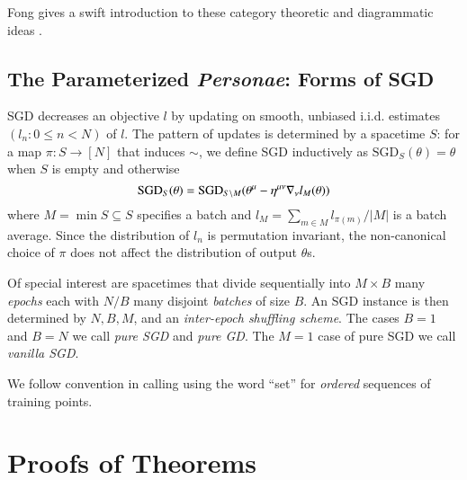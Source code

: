 \documentclass{article}
\newcommand{\SGD}{\text{\textnormal{SGD}}}
\newcommand{\wabs}[1]{\left|#1\right|}
\begin{document}
        Fong gives a swift introduction to these category theoretic and
        diagrammatic ideas .

    \subsection{The Parameterized \emph{Personae}: Forms of SGD}
        SGD decreases an objective $l$ by updating on smooth, unbiased i.i.d.
        estimates $(l_n: 0\leq n<N)$ of $l$.  The pattern of updates is
        determined by a spacetime $S$: for a map
        $\pi:S\to [N]$ that induces $\sim$, we define SGD inductively as
        $\text{SGD}_{S}(\theta) = \theta$ when $S$ is empty and otherwise
        $$
            \SGD_S(\theta)
            =
            \SGD_{S\setminus M}(
                \theta^\mu - \eta^{\mu\nu} \nabla_\nu l_{M}(\theta)
            )
        $$
        where $M = \min S \subseteq S$ specifies a batch and $l_M = \sum_{m\in
        M} l_{\pi(m)} / \wabs{M}$ is a batch average.  Since the distribution
        of $l_n$ is permutation invariant, the non-canonical choice of $\pi$
        does not affect the distribution of output $\theta$s.
    
        Of special interest are spacetimes that divide sequentially into
        $M\times B$ many \emph{epochs} each with $N/B$ many disjoint
        \emph{batches} of size $B$.  An SGD instance is then determined by $N,
        B, M$, and an \emph{inter-epoch shuffling scheme}.  The cases $B=1$ and
        $B=N$ we call \emph{pure SGD} and \emph{pure GD}.  The $M=1$ case of
        pure SGD we call \emph{vanilla SGD}.

        We follow convention in calling using the word ``set'' for
        \emph{ordered} sequences of training points. 



\section{Proofs of Theorems} \label{sect:proofs}
   
\end{document}
